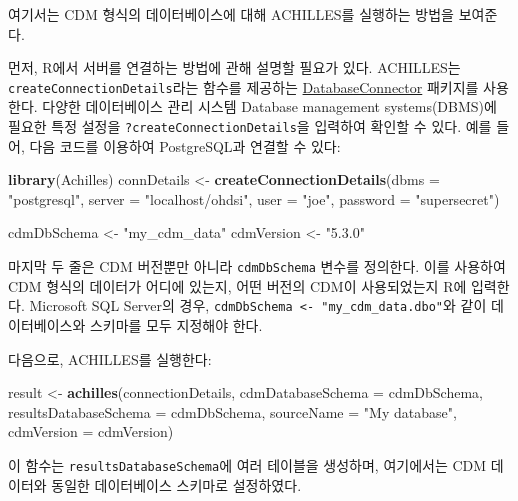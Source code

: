 \documentclass[10.5pt]{book}
\newenvironment{Shaded}{\begin{snugshade}}{\end{snugshade}}
\newcommand{\KeywordTok}[1]{\textcolor[rgb]{0.13,0.29,0.53}{\textbf{#1}}}
\newcommand{\DataTypeTok}[1]{\textcolor[rgb]{0.13,0.29,0.53}{#1}}
\newcommand{\StringTok}[1]{\textcolor[rgb]{0.31,0.60,0.02}{#1}}
\newcommand{\NormalTok}[1]{#1}
\theoremstyle{definition}
\theoremstyle{definition}
\theoremstyle{definition}
\theoremstyle{remark}
\begin{document}
여기서는 CDM 형식의 데이터베이스에 대해 ACHILLES를 실행하는 방법을
보여준다.

먼저, R에서 서버를 연결하는 방법에 관해 설명할 필요가 있다. ACHILLES는
\texttt{createConnectionDetails}라는 함수를 제공하는
\href{https://ohdsi.github.io/DatabaseConnector/}{DatabaseConnector}
패키지를 사용한다. 다양한 데이터베이스 관리 시스템 Database management
systems(DBMS)에 필요한 특정 설정을 \texttt{?createConnectionDetails}을
입력하여 확인할 수 있다. 예를 들어, 다음 코드를 이용하여 PostgreSQL과
연결할 수 있다:

\begin{Shaded}
\begin{Highlighting}[]
\KeywordTok{library}\NormalTok{(Achilles)}
\NormalTok{connDetails <-}\StringTok{ }\KeywordTok{createConnectionDetails}\NormalTok{(}\DataTypeTok{dbms =} \StringTok{"postgresql"}\NormalTok{,}
                                       \DataTypeTok{server =} \StringTok{"localhost/ohdsi"}\NormalTok{,}
                                       \DataTypeTok{user =} \StringTok{"joe"}\NormalTok{,}
                                       \DataTypeTok{password =} \StringTok{"supersecret"}\NormalTok{)}

\NormalTok{cdmDbSchema <-}\StringTok{ "my_cdm_data"}
\NormalTok{cdmVersion <-}\StringTok{ "5.3.0"}
\end{Highlighting}
\end{Shaded}

마지막 두 줄은 CDM 버전뿐만 아니라 \texttt{cdmDbSchema} 변수를 정의한다.
이를 사용하여 CDM 형식의 데이터가 어디에 있는지, 어떤 버전의 CDM이
사용되었는지 R에 입력한다. Microsoft SQL Server의 경우,
\texttt{cdmDbSchema\ \textless{}-\ "my\_cdm\_data.dbo"}와 같이
데이터베이스와 스키마를 모두 지정해야 한다.

다음으로, ACHILLES를 실행한다:

\begin{Shaded}
\begin{Highlighting}[]
\NormalTok{result <-}\StringTok{ }\KeywordTok{achilles}\NormalTok{(connectionDetails,}
                   \DataTypeTok{cdmDatabaseSchema =}\NormalTok{ cdmDbSchema,}
                   \DataTypeTok{resultsDatabaseSchema =}\NormalTok{ cdmDbSchema,}
                   \DataTypeTok{sourceName =} \StringTok{"My database"}\NormalTok{,}
                   \DataTypeTok{cdmVersion =}\NormalTok{ cdmVersion)}
\end{Highlighting}
\end{Shaded}

이 함수는 \texttt{resultsDatabaseSchema}에 여러 테이블을 생성하며,
여기에서는 CDM 데이터와 동일한 데이터베이스 스키마로 설정하였다.
\end{document}
